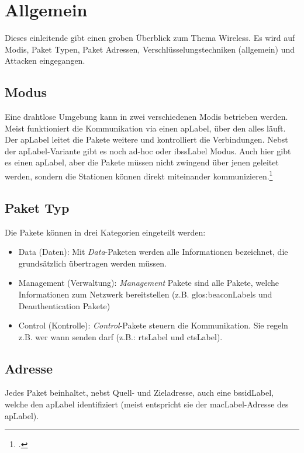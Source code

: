 \chapter{Allgemein}
Dieses einleitende  gibt einen groben Überblick zum Thema Wireless. Es wird auf Modis, Paket Typen, Paket Adressen, Verschlüsselungstechniken (allgemein) und Attacken eingegangen.

\section{Modus}
Eine drahtlose Umgebung kann in zwei verschiedenen Modis betrieben werden.
Meist funktioniert die Kommunikation via einen \gls{apLabel}, über den alles läuft. Der \gls{apLabel} leitet die Pakete weitere und kontrolliert die Verbindungen.
Nebst der \gls{apLabel}-Variante gibt es noch ad-hoc oder \gls{ibssLabel} Modus. Auch hier gibt es einen \gls{apLabel}, aber die Pakete müssen nicht zwingend über jenen geleitet werden, sondern die Stationen können direkt miteinander kommunizieren.\footcite[][38]{WrightCache201503}

\section{Paket Typ}
Die Pakete können in drei Kategorien eingeteilt werden:
\begin{itemize}
	\item Data (Daten): Mit \textit{Data}-Paketen werden alle Informationen bezeichnet, die grundsätzlich übertragen werden müssen.
	\item Management (Verwaltung): \textit{Management} Pakete sind alle Pakete, welche Informationen zum Netzwerk bereitstellen (z.B. \glspl{glos:beaconLabel} und Deauthentication Pakete)
	\item Control (Kontrolle): \textit{Control}-Pakete steuern die Kommunikation. Sie regeln z.B. wer wann senden darf (z.B.: \gls{rtsLabel} und \gls{ctsLabel}).
\end{itemize}

\section{Adresse}
Jedes Paket beinhaltet, nebst Quell- und Zieladresse, auch eine \gls{bssidLabel}, welche den \gls{apLabel} identifiziert (meist entspricht sie der \gls{macLabel}-Adresse des \gls{apLabel}).


